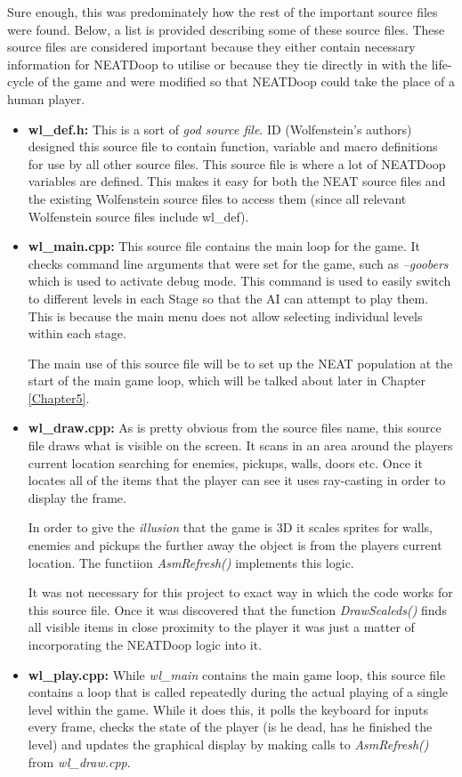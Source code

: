 \documentclass[]{Learning-to-Play-Wolfenstein-thesis}
\begin{document}
Sure enough, this was predominately how the rest of the important source files were found. Below, a list is provided describing some of these source files. These source files are considered important because they either contain necessary information for NEATDoop to utilise or because they tie directly in with the life-cycle of the game and were modified so that NEATDoop could take the place of a human player. 
\begin{itemize}
\item\textbf{wl\_def.h:} This is a sort of \textit{god source file}. ID (Wolfenstein's authors) designed this source file to contain function, variable and macro definitions for use by all other source files. This source file is where a lot of NEATDoop variables are defined. This makes it easy for both the NEAT source files and the existing Wolfenstein source files to access them (since all relevant Wolfenstein source files include wl\_def).
\item\textbf{wl\_main.cpp:} This source file contains the main loop for the game. It checks command line arguments that were set for the game, such as \textit{--goobers} which is used to activate debug mode. This command is used to easily switch to different levels in each Stage so that the AI can attempt to play them. This is because the main menu does not allow selecting individual levels within each stage. 

The main use of this source file will be to set up the NEAT population at the start of the main game loop, which will be talked about later in Chapter \ref{Chapter5}.
\item\textbf{wl\_draw.cpp:} As is pretty obvious from the source files name, this source file draws what is visible on the screen. It scans in an area around the players current location searching for enemies, pickups, walls, doors etc. Once it locates all of the items that the player can see it uses ray-casting in order to display the frame. 

In order to give the \textit{illusion} that the game is 3D it scales sprites for walls, enemies and pickups the further away the object is from the players current location. The functiion \textit{AsmRefresh()} implements this logic.

It was not necessary for this project to exact way in which the code works for this source file. Once it was discovered that the function \textit{DrawScaleds()} finds all visible items in close proximity to the player it was just a matter of incorporating the NEATDoop logic into it.
\item\textbf{wl\_play.cpp:} While \textit{wl\_main} contains the main game loop, this source file contains a loop that is called repeatedly during the actual playing of a single level within the game. While it does this, it polls the keyboard for inputs every frame, checks the state of the player (is he dead, has he finished the level) and updates the graphical display by making calls to \textit{AsmRefresh()} from \textit{wl\_draw.cpp}.


\end{itemize}
\end{document}
